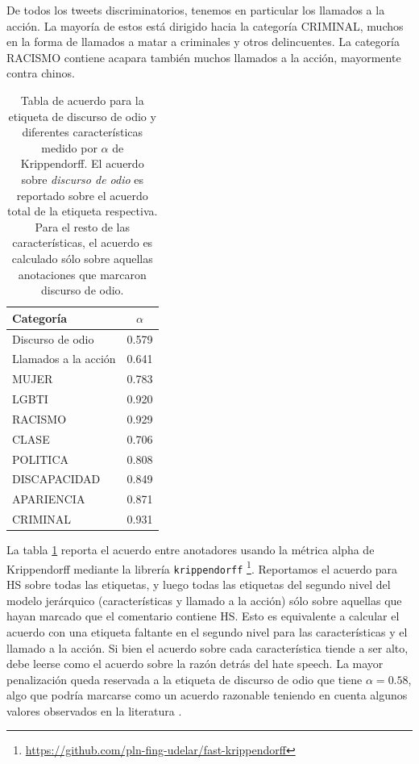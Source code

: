 De todos los tweets discriminatorios, tenemos en particular los llamados a la acción. La mayoría de estos está dirigido hacia la categoría CRIMINAL, muchos en la forma de llamados a matar a criminales y otros delincuentes. La categoría RACISMO contiene acapara también muchos llamados a la acción, mayormente contra chinos.


\begin{table}
    \centering
    \begin{tabular}{lc}
        \toprule
        Categoría   & $\alpha$  \\
        \midrule
        Discurso de odio     &  0.579 \\
        Llamados a la acción &  0.641 \\
        \midrule
        MUJER                &  0.783 \\
        LGBTI                &  0.920 \\
        RACISMO              &  0.929 \\
        CLASE                &  0.706 \\
        POLITICA             &  0.808 \\
        DISCAPACIDAD         &  0.849 \\
        APARIENCIA           &  0.871 \\
        CRIMINAL             &  0.931 \\
        \bottomrule
    \end{tabular}
    \caption{Tabla de acuerdo para la etiqueta de discurso de odio y diferentes características medido por $\alpha$ de Krippendorff. El acuerdo sobre \emph{discurso de odio} es reportado sobre el acuerdo total de la etiqueta respectiva. Para el resto de las características, el acuerdo es calculado sólo sobre aquellas anotaciones que marcaron discurso de odio.}
    \label{tab:annotation_agreement}
\end{table}

La tabla \ref{tab:annotation_agreement} reporta el acuerdo entre anotadores usando la métrica alpha de Krippendorff \cite{krippendorff2018content} mediante la librería \verb|krippendorff| \footnote{\url{https://github.com/pln-fing-udelar/fast-krippendorff}}. Reportamos el acuerdo para HS sobre todas las etiquetas, y luego todas las etiquetas del segundo nivel del modelo jerárquico (características y llamado a la acción) sólo sobre aquellas que hayan marcado que el comentario contiene HS. Esto es equivalente a calcular el acuerdo con una etiqueta faltante en el segundo nivel para las características y el llamado a la acción. Si bien el acuerdo sobre cada característica tiende a ser alto, debe leerse como el acuerdo sobre la razón detrás del hate speech. La mayor penalización queda reservada a la etiqueta de discurso de odio que tiene $\alpha = 0.58$, algo que podría marcarse como un acuerdo razonable teniendo en cuenta algunos valores observados en la literatura \cite{poletto2021resources}.




